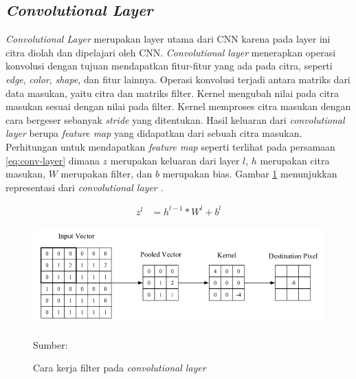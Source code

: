     \subsection{\textit{Convolutional Layer}}
    \textit{Convolutional Layer} merupakan layer utama dari CNN karena pada layer ini citra diolah dan dipelajari oleh CNN. \textit{Convolutional layer} menerapkan operasi konvolusi dengan tujuan mendapatkan fitur-fitur yang ada pada citra, seperti \textit{edge}, \textit{color}, \textit{shape}, dan fitur lainnya. Operasi konvolusi terjadi antara matriks dari data masukan, yaitu citra dan matriks filter. Kernel mengubah nilai pada citra masukan sesuai dengan nilai pada filter. Kernel memproses citra masukan dengan cara bergeser sebanyak \textit{stride} yang ditentukan. Hasil keluaran dari \textit{convolutional layer} berupa \textit{feature map} yang didapatkan dari sebuah citra masukan. Perhitungan untuk mendapatkan \textit{feature map} seperti terlihat pada persamaan \ref{eq:conv-layer} dimana $z$ merupakan keluaran dari layer $l$, $h$ merupakan citra masukan, $W$ merupakan filter, dan $b$ merupakan bias. Gambar \ref{fig:conv} menunjukkan representasi dari \textit{convolutional layer} \citep{OShea2015}.

    \begin{align}
        \label{eq:conv-layer}
        z^l &= h^{l-1}\ast W^l + b^l
    \end{align}

    \begin{figure}[H]
        \begin{center}
            \includegraphics[width=12cm]{../img/CNN Convolutional Layer - Latex.png}
            \caption{Cara kerja filter pada \textit{convolutional layer}}
            \label{fig:conv}
            Sumber: \citep{OShea2015}
        \end{center}
    \end{figure}

